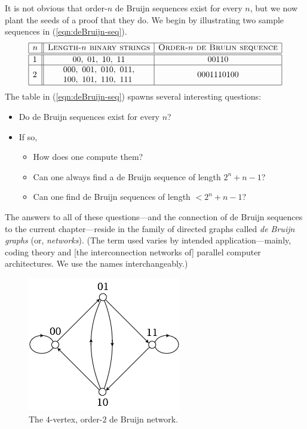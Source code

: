 It is not obvious that order-$n$ de Bruijn sequences exist for every $n$, but we now plant the
seeds of a proof that they do.  We begin by illustrating two sample sequences in (\ref{eqn:deBruijn-seq}).
\begin{equation}
\label{eqn:deBruijn-seq}
\begin{array}{|l||c|c|}
\hline
n & \mbox{\sc Length-$n$ binary strings}
    & \mbox{\sc Order-$n$ de Bruijn sequence} \\
\hline
\hline
1 &
00, \ 01, \ 10, \ 11  & 00110 \\
\hline
2 &
\begin{array}{l}
000, \ 001, \ 010, \ 011, \\
100, \ 101, \ 110, \ 111 
\end{array}
  & 0001110100 \\
\hline
\end{array}
\end{equation}
The table in (\ref{eqn:deBruijn-seq}) spawns several interesting questions:
\begin{itemize}
\item
Do de Bruijn sequences exist for every $n$?
\medskip\item
If so, 
  \begin{itemize}
  \item
How does one compute them?
  \medskip\item
Can one always find a de Bruijn sequence of length $2^n +n-1$?
  \medskip\item
Can one find de Bruijn sequences of length $< 2^n +n-1$?
  \end{itemize}
\end{itemize}
The answers to all of these questions---and the connection of de Bruijn sequences to the current chapter---reside in the family of directed graphs called {\it de Bruijn graphs} (or, {\it networks}).
(The term used varies by intended application---mainly, coding theory and [the interconnection networks of] parallel computer architectures.  We use the names interchangeably.)
\begin{figure}[hbt]
\begin{center}
       \includegraphics[scale=0.45]{FiguresGraph/dB2by2}
       \caption{The $4$-vertex, order-$2$ de Bruijn network.}
  \label{fig:dB2by2}
\end{center}
\end{figure}

